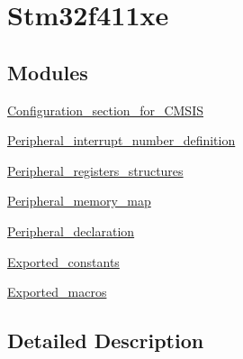 \hypertarget{group__stm32f411xe}{}\section{Stm32f411xe}
\label{group__stm32f411xe}
\subsection*{Modules}
\begin{DoxyCompactItemize}
\item 
\hyperlink{group___configuration__section__for___c_m_s_i_s}{Configuration\+\_\+section\+\_\+for\+\_\+\+C\+M\+S\+IS}
\item 
\hyperlink{group___peripheral__interrupt__number__definition}{Peripheral\+\_\+interrupt\+\_\+number\+\_\+definition}
\item 
\hyperlink{group___peripheral__registers__structures}{Peripheral\+\_\+registers\+\_\+structures}
\item 
\hyperlink{group___peripheral__memory__map}{Peripheral\+\_\+memory\+\_\+map}
\item 
\hyperlink{group___peripheral__declaration}{Peripheral\+\_\+declaration}
\item 
\hyperlink{group___exported__constants}{Exported\+\_\+constants}
\item 
\hyperlink{group___exported__macros}{Exported\+\_\+macros}
\end{DoxyCompactItemize}


\subsection{Detailed Description}
